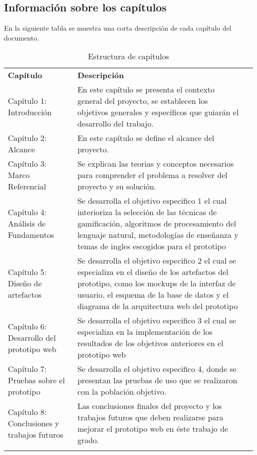 \begin{center}
	\section*{Información sobre los capítulos
}	
\end{center}

En la siguiente tabla se muestra una corta descripción de cada capítulo del documento. 

\begin{longtable}{|p{4.5cm}|p{8.5cm}|p{2.5cm}|}
\cline{1-3} 
\cellcolor[gray]{0.9} \textbf{Capítulo} & \cellcolor[gray]{0.9}\textbf{Descripción}\\
\cline{1-3}
Capítulo 1: {Introducción} & {En este capítulo se presenta el contexto general del proyecto, se establecen los objetivos generales y específicos que guiarán el desarrollo del trabajo.}\\

\cline{1-3}
Capítulo 2: {Alcance} & {En este capítulo se define el alcance del proyecto.}\\

\cline{1-3}
Capítulo 3: {Marco Referencial} & {Se explican las teorias y  conceptos necesarios para comprender el problema a resolver del proyecto y su solución.}\\

\cline{1-3}
Capítulo 4: {Análisis de Fundamentos} & {Se desarrolla el objetivo especifico 1 el cual interioriza la selección de las técnicas de gamificación, algoritmos de procesamiento del lenguaje natural, metodologías de enseñanza y temas de ingles escogidos para el prototipo}\\

\cline{1-3}
Capítulo 5: {Diseño de artefactos} & {Se desarrolla el objetivo especifico 2 el cual se especializa en el diseño de los artefactos del prototipo, como los mockups de la interfaz de usuario, el esquema de la base de datos y el diagrama de la arquitectura web del prototipo }\\

\cline{1-3}
Capítulo 6: {Desarrollo del prototipo web} & {Se desarrolla el objetivo especifico 3 el cual se especializa en la implementación de los resultados de los objetivos anteriores en el prototipo web}\\

\cline{1-3}
Capítulo 7: {Pruebas sobre el prototipo} & {Se desarrolla el objetivo especifico 4, donde se presentan las pruebas de uso que se realizaron con la población objetivo.}\\

\cline{1-3}

Capítulo 8: {Conclusiones y trabajos futuros} & {Las conclusiones finales del proyecto y los trabajos futuros que deben realizarse para mejorar el prototipo web en éste trabajo de grado.}\\
\cline{1-3}
\caption{Estructura de capítulos}\\
\end{longtable}

\begin{center}
\end{center}

